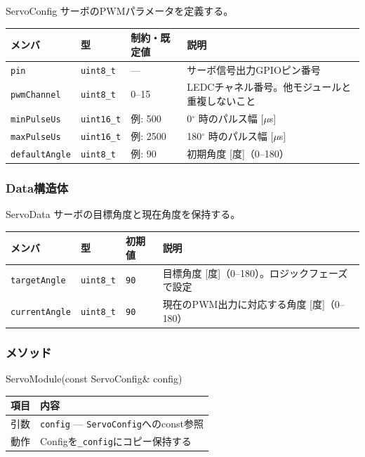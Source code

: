 \begin{funcblock}{ServoConfig}
サーボのPWMパラメータを定義する。

\begin{longtable}{l l l p{4.5cm}}
\toprule
\textbf{メンバ} & \textbf{型} & \textbf{制約・既定値} & \textbf{説明} \\
\midrule
\endhead
\texttt{pin}          & \texttt{uint8\_t}  & ---       & サーボ信号出力GPIOピン番号 \\
\texttt{pwmChannel}   & \texttt{uint8\_t}  & 0--15     & LEDCチャネル番号。他モジュールと重複しないこと \\
\texttt{minPulseUs}   & \texttt{uint16\_t} & 例: 500   & 0$^{\circ}$ 時のパルス幅 [$\mu$s] \\
\texttt{maxPulseUs}   & \texttt{uint16\_t} & 例: 2500  & 180$^{\circ}$ 時のパルス幅 [$\mu$s] \\
\texttt{defaultAngle} & \texttt{uint8\_t}  & 例: 90    & 初期角度 [度]（0--180） \\
\bottomrule
\end{longtable}
\end{funcblock}

\subsubsection{Data構造体}

\begin{funcblock}{ServoData}
サーボの目標角度と現在角度を保持する。

\begin{longtable}{l l l p{5.0cm}}
\toprule
\textbf{メンバ} & \textbf{型} & \textbf{初期値} & \textbf{説明} \\
\midrule
\endhead
\texttt{targetAngle}  & \texttt{uint8\_t} & \texttt{90} & 目標角度 [度]（0--180）。ロジックフェーズで設定 \\
\texttt{currentAngle} & \texttt{uint8\_t} & \texttt{90} & 現在のPWM出力に対応する角度 [度]（0--180） \\
\bottomrule
\end{longtable}
\end{funcblock}

\subsubsection{メソッド}

\begin{funcblock}{ServoModule(const ServoConfig\& config)}
\begin{tabularx}{\textwidth}{l X}
\toprule
\textbf{項目} & \textbf{内容} \\
\midrule
引数   & \texttt{config} --- \texttt{ServoConfig}へのconst参照 \\
動作   & Configを\texttt{\_config}にコピー保持する \\
\bottomrule
\end{tabularx}
\end{funcblock}

